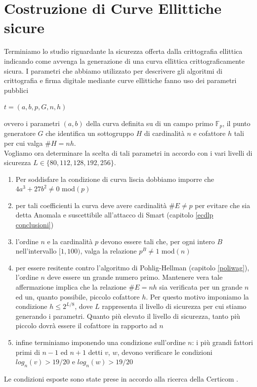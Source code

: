 \documentclass[a4paper,12pt]{tesiinfo}
\begin{document}
\section{Costruzione di Curve Ellittiche sicure}
Terminiamo lo studio riguardante la sicurezza offerta dalla crittografia ellittica indicando come avvenga la generazione di una curva ellittica crittograficamente sicura. I parametri che abbiamo utilizzato per descrivere gli algoritmi di crittografia e firma digitale mediante curve ellittiche fanno uso dei parametri pubblici
\begin{center}
$t=(a, b, p, G, n, h)$
\end{center}
ovvero i parametri $(a, b)$ della curva definita su di un campo primo $\mathbb{F}_p$, il punto generatore $G$ che identifica un sottogruppo $H$ di cardinalit\`a $n$ e cofattore $h$ tali per cui valga $\#H=nh$.
\\
Vogliamo ora determinare la scelta di tali parametri in accordo con i vari livelli di sicurezza $L \in \{80, 112, 128, 192, 256\}$.
\begin{enumerate}
 \item Per soddisfare la condizione di curva liscia dobbiamo imporre che $4a^3+27b^2 \ne 0$ mod$(p)$
 \item per tali coefficienti la curva deve avere cardinalit\`a $\#E \ne p$ per evitare che sia detta Anomala e suscettibile all'attacco di Smart (capitolo \ref{ecdlp conclusioni})
 \item l'ordine $n$ e la cardinalit\`a $p$ devono essere tali che, per ogni intero $B$ nell'intervallo $[1, 100)$, valga la relazione $p^B \ne 1$ mod$(n)$
 \item per essere resitente contro l'algoritmo di Pohlig-Hellman (capitolo \ref{poliwag}), l'ordine $n$ deve essere un grande numero primo. Mantenere vera tale affermazione implica che la relazione $\#E=nh$ sia verificata per un grande $n$ ed un, quanto possibile, piccolo cofattore $h$. Per questo motivo imponiamo la condizione $h \leq 2^{L / 8}$, dove $L$ rappresenta il livello di sicurezza per cui stiamo generando i parametri. Quanto pi\`u elevato il livello di sicurezza, tanto pi\`u piccolo dovr\`a essere il cofattore in rapporto ad $n$
 \item infine terminiamo imponendo una condizione sull'ordine $n$: i pi\`u grandi fattori primi di $n-1$ ed $n+1$ detti $v$, $w$, devono verificare le condizioni $log_n (v) > 19/20$ e $ log_n (w) > 19/20$
\end{enumerate}
Le condizioni esposte sono state prese in accordo alla ricerca della Certicom \cite{sec1}. 
\end{document}
